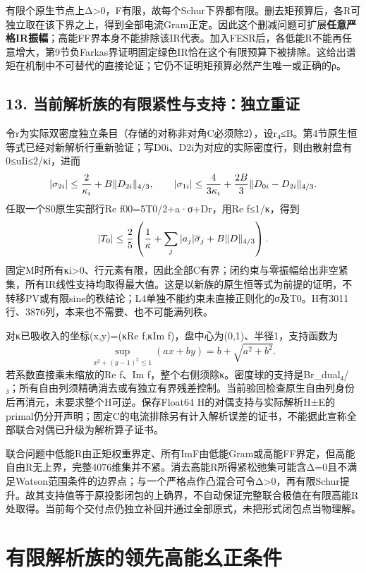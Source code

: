 \documentclass[
  10pt,
  a4paper,
]{article}
\begin{document}
有限个原生节点上Δ\textgreater0，F有限，故每个Schur下界都有限。删去矩预算后，各R可独立取在该下界之上，得到全部电流Gram正定。因此这个删减问题可扩展\textbf{任意严格IR振幅}；高能FF界本身不能排除该IR代表。加入FESR后，各低能R不能再任意增大，第9节负Farkas界证明固定绿色IR恰在这个有限预算下被排除。这给出谱矩在机制中不可替代的直接论证；它仍不证明矩预算必然产生唯一或正确的ρ。

\subsection{13.
当前解析族的有限紧性与支持：独立重证}\label{ux5f53ux524dux89e3ux6790ux65cfux7684ux6709ux9650ux7d27ux6027ux4e0eux652fux6301ux72ecux7acbux91cdux8bc1}

令r为实际双密度独立条目（存储的对称非对角C必须除2），设\textbar\textbar r\textbar\textbar₄≤B。第4节原生恒等式已经对新解析行重新验证；写D0i、D2i为对应的实际密度行，则由散射盘有0≤uIi≤2/κi，进而
\[
|\sigma_{2i}|\le {2\over\kappa_i}+B\|D_{2i}\|_{4/3},\qquad
|\sigma_{1i}|\le {4\over3\kappa_i}+{2B\over3}\|D_{0i}-D_{2i}\|_{4/3}.
\] 任取一个S0原生实部行Re f00=5T0/2+a·σ+Dr，用\textbar Re
f\textbar≤1/κ，得到 \[
|T_0|\le {2\over5}\left({1\over\kappa}+\sum_j|a_j|\overline\sigma_j+B\|D\|_{4/3}\right).
\]
固定M时所有κi\textgreater0、行元素有限，因此全部C有界；闭约束与零振幅给出非空紧集，所有IR线性支持均取得最大值。这是以新族的原生恒等式为前提的证明，不转移PV或有限sine的秩结论；L4单独不能约束未直接正则化的σ及T0。H有3011行、3876列，本来也不需要、也不可能满列秩。

对κ已吸收入的坐标(x,y)=(κRe f,κIm f)，盘中心为(0,1)、半径1，支持函数为
\[
\sup_{x^2+(y-1)^2\le1}(a x+b y)=b+\sqrt{a^2+b^2}.
\] 若系数直接乘未缩放的Re f、Im
f，整个右侧须除κ。密度球的支持是B\textbar\textbar r\_dual\textbar\textbar₄/₃；所有自由列须精确消去或有独立有界残差控制。当前验回检查原生自由列身份后再消元，未要求整个H可逆。保存Float64
H的对偶支持与实际解析H±E的primal仍分开声明；固定C的电流排除另有计入解析误差的证书，不能据此宣称全部联合对偶已升级为解析算子证书。

联合问题中低能R由正矩权重界定、所有ImF由低能Gram或高能FF界定，但高能自由R无上界，完整4076维集并不紧。消去高能R所得紧松弛集可能含Δ=0且不满足Watson范围条件的边界点；与一个严格点作凸混合可令Δ\textgreater0，再有限Schur提升。故其支持值等于原投影闭包的上确界，不自动保证完整联合极值在有限高能R处取得。当前每个交付点仍独立补回并通过全部原式，未把形式闭包点当物理解。

\newpage

\section{有限解析族的领先高能幺正条件}\label{ux6709ux9650ux89e3ux6790ux65cfux7684ux9886ux5148ux9ad8ux80fdux5e7aux6b63ux6761ux4ef6}
\end{document}
